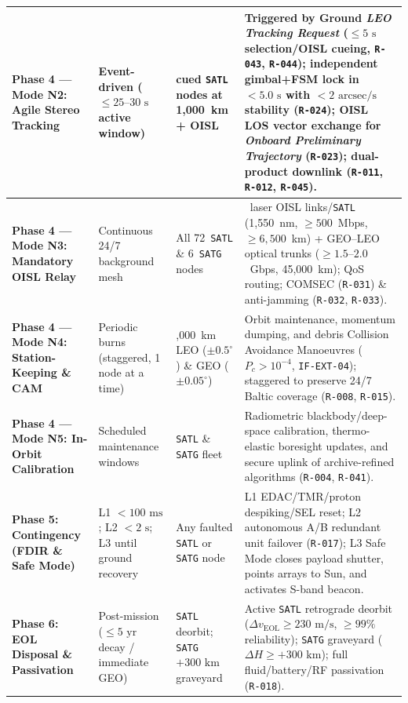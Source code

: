 \documentclass[11pt,a4paper]{article}
\providecommand{\abbr}[1]{#1}
\begin{document}
\begin{table}[H]
{\begin{tabularx}{\textwidth}{|>{\raggedright\arraybackslash}p{2.5cm}|>{\raggedright\arraybackslash}p{2.0cm}|>{\raggedright\arraybackslash}p{2.7cm}|>{\raggedright\arraybackslash}X|}
    \textbf{Phase 4 --- Mode N2: Agile Stereo Tracking} & Event-driven ($\le 25\text{--}30\text{ s}$ active window) & 2 cued \texttt{SATL} nodes at 1,000~km + \abbr{OISL} & Triggered by Ground \emph{LEO Tracking Request} ($\le 5\text{ s}$ selection/\abbr{OISL} cueing, \texttt{R-043}, \texttt{R-044}); independent gimbal+\abbr{FSM} lock in $< 5.0\text{ s}$ with $< 2\text{ arcsec/s}$ stability (\texttt{R-024}); \abbr{OISL} \abbr{LOS} vector exchange for \emph{Onboard Preliminary Trajectory} (\texttt{R-023}); dual-product downlink (\texttt{R-011}, \texttt{R-012}, \texttt{R-045}). \\ \hline
    \textbf{Phase 4 --- Mode N3: Mandatory \abbr{OISL} Relay} & Continuous 24/7 background mesh & All 72~\texttt{SATL} \& 6~\texttt{SATG} nodes & 4~laser \abbr{OISL} links/\texttt{SATL} (1,550~nm, $\ge 500$~Mbps, $\ge 6,500$~km) + \abbr{GEO}--\abbr{LEO} optical trunks ($\ge 1.5\text{--}2.0$~Gbps, 45,000~km); \abbr{QoS} routing; \abbr{COMSEC} (\texttt{R-031}) \& anti-jamming (\texttt{R-032}, \texttt{R-033}). \\ \hline
    \textbf{Phase 4 --- Mode N4: Station-Keeping \& \abbr{CAM}} & Periodic burns (staggered, 1 node at a time) & 1,000~km \abbr{LEO} ($\pm 0.5^\circ$) \& \abbr{GEO} ($\pm 0.05^\circ$) & Orbit maintenance, momentum dumping, and debris Collision Avoidance Manoeuvres ($P_c > 10^{-4}$, \texttt{IF-EXT-04}); staggered to preserve 24/7 Baltic coverage (\texttt{R-008}, \texttt{R-015}). \\ \hline
    \textbf{Phase 4 --- Mode N5: In-Orbit Calibration} & Scheduled maintenance windows & \texttt{SATL} \& \texttt{SATG} fleet & Radiometric blackbody/deep-space calibration, thermo-elastic boresight updates, and secure uplink of archive-refined algorithms (\texttt{R-004}, \texttt{R-041}). \\ \hline
    \textbf{Phase 5: Contingency (\abbr{FDIR} \& Safe Mode)} & L1 $< 100\text{ ms}$; L2 $< 2\text{ s}$; L3 until ground recovery & Any faulted \texttt{SATL} or \texttt{SATG} node & L1 \abbr{EDAC}/\abbr{TMR}/proton despiking/\abbr{SEL} reset; L2 autonomous A/B redundant unit failover (\texttt{R-017}); L3 Safe Mode closes payload shutter, points arrays to Sun, and activates S-band beacon. \\ \hline
    \textbf{Phase 6: \abbr{EOL} Disposal \& Passivation} & Post-mission ($\le 5\text{ yr}$ decay / immediate \abbr{GEO}) & \texttt{SATL} deorbit; \texttt{SATG} $+300\text{ km}$ graveyard & Active \texttt{SATL} retrograde deorbit ($\Delta v_{\text{EOL}} \ge 230\text{ m/s}$, $\ge 99\%$ reliability); \texttt{SATG} graveyard ($\Delta H \ge +300\text{ km}$); full fluid/battery/RF passivation (\texttt{R-018}). \\ \hline
\end{tabularx}}
\end{table}
\end{document}
